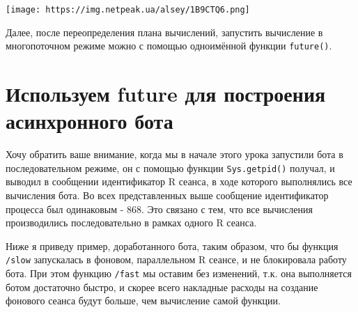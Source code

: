 \documentclass[
]{book}
\begin{document}
\texttt{[image: https://img.netpeak.ua/alsey/1B9CTQ6.png]}

Далее, после переопределения плана вычислений, запустить вычисление в многопоточном режиме можно с помощью одноимённой функции \texttt{future()}.

\section{Используем future для построения асинхронного бота}\label{ux438ux441ux43fux43eux43bux44cux437ux443ux435ux43c-future-ux434ux43bux44f-ux43fux43eux441ux442ux440ux43eux435ux43dux438ux44f-ux430ux441ux438ux43dux445ux440ux43eux43dux43dux43eux433ux43e-ux431ux43eux442ux430}

Хочу обратить ваше внимание, когда мы в начале этого урока запустили бота в последовательном режиме, он с помощью функции \texttt{Sys.getpid()} получал, и выводил в сообщении идентификатор R сеанса, в ходе которого выполнялись все вычисления бота. Во всех представленных выше сообщение идентификатор процесса был одинаковым - 868. Это связано с тем, что все вычисления производились последовательно в рамках одного R сеанса.

Ниже я приведу пример, доработанного бота, таким образом, что бы функция \texttt{/slow} запускалась в фоновом, параллельном R сеансе, и не блокировала работу бота. При этом функцию \texttt{/fast} мы оставим без изменений, т.к. она выполняется ботом достаточно быстро, и скорее всего накладные расходы на создание фонового сеанса будут больше, чем вычисление самой функции.
\end{document}
